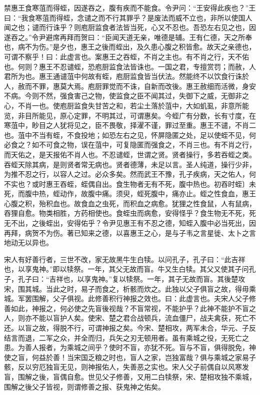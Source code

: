 \documentclass[]{article}
\begin{document}
禁惠王食寒菹而得蛭，因遂吞之，腹有疾而不能食。令尹问：``王安得此疾也？''王曰：``我食寒菹而得蛭，念谴之而不行其罪乎？是废法而威不立也，非所以使国人闻之也；谴而行诛乎？则庖厨监食者法皆当死，心又不忍也。吾恐左右见之也，因遂吞之。''令尹避席再拜而贺曰：``臣闻天道无亲，唯德是辅。王有仁德，天之所奉也，病不为伤。''是夕也，惠王之後而蛭出，及久患心腹之积皆愈。故天之亲德也，可谓不察乎！曰：此虚言也。案惠王之吞蛭，不肖之主也。有不肖之行，天不佑也。何则？惠王不忍谴蛭，恐庖厨监食法皆诛也。一国之君，专擅赏罚；而赦，人君所为也。惠王通谴菹中何故有蛭，庖厨监食皆当伏法。然能终不以饮食行诛於人，赦而不罪，惠莫大焉。庖厨罪觉而不诛，自新而改後。惠王赦细而活微，身安不病。今则不然，强食害己之物，使监食之臣不闻其过，失御下之威，无御非之心，不肖一也。使庖厨监食失甘苦之和，若尘土落於菹中，大如虮虱，非意所能览，非目所能见，原心定罪，不明其过，可谓惠矣。今蛭广有分数，长有寸度，在寒菹中，眇目之人犹将见之，臣不畏敬，择濯不谨，罪过至重。惠王不谴，不肖二也。菹中不当有蛭，不食投地；如恐左右之见，怀屏隐匿之处，足以使蛭不见，何必食之？如不可食之物，误在菹中，可复隐匿而强食之，不肖三也。有不肖之行，而天佑之，是天报佑不肖人也。不忍谴蛭，世谓之贤。贤者操行，多若吞蛭之类。吞蛭天除其病，是则贤者常无病也。贤者德薄，未足以言。圣人纯道，操行少非，为推不忍之行，以容人之过。必众多矣。然而武王不豫，孔子疾病，天之佑人，何不实也？或时惠王吞蛭，蛭偶自出。食生物者无有不死，腹中热也。初吞时蛭〕未死，而腹中热，蛭动作，故腹中痛。须臾，蛭死腹中，痛亦止。蛭之性食血，惠王心腹之积，殆积血也。故食血之虫死，而积血之病愈。犹狸之性食鼠，人有鼠病，吞狸自愈。物类相胜，方药相使也。食蛭虫而病愈，安得怪乎？食生物无不死，死无不出，之後蛭出，安得佑乎？令尹见惠王有不忍之德，知蛭入腹中必当死出，因再拜，病贺不为伤。著已知来之德，以喜惠王之心，是与子韦之言星徙、太卜之言地动无以异也。

宋人有好善行者，三世不改，家无故黑牛生白犊。以问孔子，孔子曰：``此吉祥也，以享鬼神。''即以犊祭。一年，其父无故而盲。牛又生白犊。其父又使其子问孔子，孔子曰：``吉祥也，以享鬼神。''复以犊祭。一年，其子无故而盲。其後楚攻宋，围其城。当此之时，易子而食之，析骸而炊之。此独以父子俱盲之故，得毋乘城。军罢围解，父子俱视。此修善积行神报之效也。曰：此虚言也。夫宋人父子修善如此，神报之，何必使之先盲後视哉？不盲常视，不能护乎？此神不能护不盲之人，则亦不能以盲护人矣。使宋、楚之君合战顿兵，流血僵尸，战夫禽获，死亡不还。以盲之故，得脱不行，可谓神报之矣。今宋、楚相攻，两军未合，华元、子反结言而退，二军之众，并全而归，兵矢之刃无顿用者。虽有乘城之役，无死亡之患。为善人报者，为乘城之间乎？使时不盲，亦犹不死。盲与不盲，俱得脱免，神使之盲，何益於善！当宋国乏粮之时也，盲人之家，岂独富哉？俱与乘城之家易子
骸，反以穷厄独盲无见，则神报佑人，失善恶之实也。宋人父子前偶自以风寒发盲，围解之後，盲偶自愈。世见父子修善，又用二白犊祭，宋、楚相攻独不乘城，围解之後父子皆视，则谓修善之报、获鬼神之佑矣。
\end{document}
